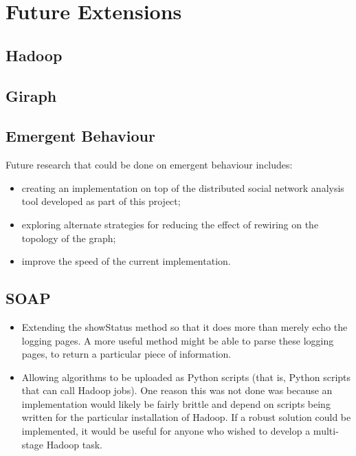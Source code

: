 \section{Future Extensions}


\subsection{Hadoop}

\subsection{Giraph}

\subsection{Emergent Behaviour}

Future research that could be done on emergent behaviour includes:

\begin{itemize}
	\item creating an implementation on top of the distributed social network analysis tool developed as part of this project;
	\item exploring alternate strategies for reducing the effect of rewiring on the topology of the graph;
	\item improve the speed of the current implementation.
\end{itemize}

\subsection{SOAP}

\begin{itemize}
	\item Extending the showStatus method so that it does more than merely echo the logging pages. A more useful method might be able to parse these logging pages, to return a particular piece of information.
	\item Allowing algorithms to be uploaded as Python scripts (that is, Python scripts that can call Hadoop jobs). One reason this was not done was because an implementation would likely be fairly brittle and depend on scripts being written for the particular installation of Hadoop. If a robust solution could be implemented, it would be useful for anyone who wished to develop a multi-stage Hadoop task. 
\end{itemize}

